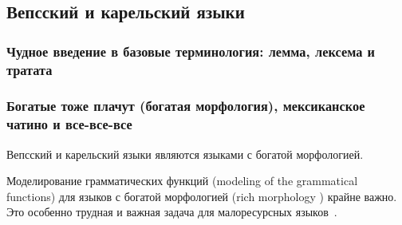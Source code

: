 \subsection{Вепсский и карельский языки}\label{sect_review_veps_karelian}


\subsubsection{Чудное введение в базовые терминология: лемма, лексема и тратата}



\subsubsection{Богатые тоже плачут (богатая морфология), мексиканское чатино и все-все-все}

Вепсский и карельский языки являются языками с богатой морфологией.

Моделирование грамматических функций (modeling of the grammatical functions)
для языков с богатой морфологией (rich morphology
) крайне важно.
Это особенно трудная и важная задача
для малоресурсных языков~\cite[2820]{Cruz-Anastasopoulos-Stump2020Chatino}.


